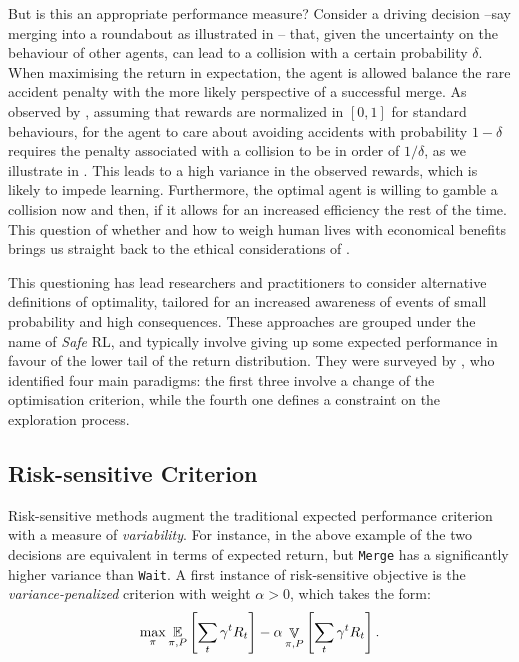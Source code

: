 But is this an appropriate performance measure? Consider a driving decision --say merging into a roundabout as illustrated in -- that, given the uncertainty on the behaviour of other agents, can lead to a collision with a certain probability $\delta$. When maximising the return in expectation, the agent is allowed balance the rare accident penalty with the more likely perspective of a successful merge. As observed by \citet{ShalevShwartz2017}, assuming that rewards are normalized in $[0, 1]$ for standard behaviours, for the agent to care about avoiding accidents with probability $1-\delta$ requires the penalty associated with a collision to be in order of $1/\delta$, as we illustrate in . This leads to a high variance in the observed rewards, which is likely to impede learning. 
Furthermore, the optimal agent is willing to gamble a collision now and then, if it allows for an increased efficiency the rest of the time. This question of whether and how to weigh human lives with economical benefits brings us straight back to the ethical considerations of .

This questioning has lead researchers and practitioners to consider alternative definitions of optimality, tailored for an increased awareness of events of small probability and high consequences. These approaches are grouped under the name of \emph{Safe} \acl*{RL}, and typically involve giving up some expected performance in favour of the lower tail of the return distribution. They were surveyed by \citet{Garcia2015}, who identified four main paradigms: the first three involve a change of the optimisation criterion, while the fourth one defines a constraint on the exploration process.

\subsection{Risk-sensitive Criterion}

Risk-sensitive methods augment the traditional expected performance criterion with a measure of \textit{variability}. For instance, in the above example of  the two decisions are equivalent in terms of expected return, but \texttt{Merge} has a significantly higher variance than \texttt{Wait}.  A first instance of risk-sensitive objective is the \emph{variance-penalized} criterion \citep{Markowitz59} with weight $\alpha > 0$, which takes the form:
\begin{equation*}
\max_\pi \operatorname*{\mathbb{E}}_{\pi, P} \left[\sum_t \gamma^t R_t\right] - \alpha\mathop{\mathbb{V}}_{\pi, P} \left[\sum_t \gamma^t R_t \right].
\end{equation*}

